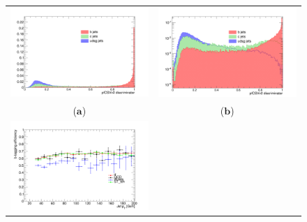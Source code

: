 \documentclass{cmspaper}
\begin{document}
\begin{figure}[htp]
\centering
\begin{tabular}{cc}
\hspace{-0.5cm}
\includegraphics[scale=0.20]{genPlots/btagged/pfCSVv2IVF_discriminator.png}
& \hspace{-0.5cm} \includegraphics[scale=0.20]{genPlots/btagged/pfCSVv2IVF_discriminator_log.png}\\
   ($\mathbf{a}$)\qquad\qquad&($\mathbf{b}$)\qquad\qquad\qquad\\
\hspace{-0.5cm}
\includegraphics[scale=0.20]{genPlots/btagged/bTaggingEfficiency_pfCSVv2IVFM.png}

\end{tabular}
\end{figure}
\end{document}

